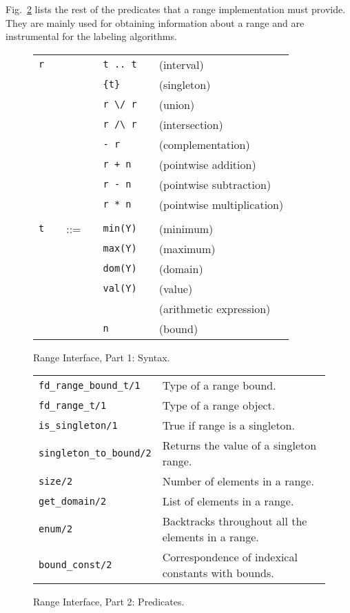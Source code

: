 \documentclass{llncs}
\begin{document}
Fig.~\ref{fig:range:preds} lists the rest of the predicates that a
range implementation must provide. They are mainly used for obtaining
information about a range and are instrumental for the labeling
algorithms.
\begin{figure}[t]
  \centering
  \begin{tabular}{lllllll}
  \verb|r|  &&  &  & \verb|t .. t| &  & (interval) \\
&&&  &  \verb|{t}| && (singleton) \\
&&&  &  \verb|r \/ r| && (union) \\
&&&  &  \verb|r /\ r| && (intersection) \\
&&&  &  \verb|- r| && (complementation) \\
&&&  &  \verb|r + n| && (pointwise addition) \\
&&&  &  \verb|r - n| && (pointwise subtraction) \\
&&&  &  \verb|r * n| && (pointwise multiplication)\\
\\
\verb|t|  && ::= && \verb|min(Y)|  && (minimum) \\
&&&  &\verb|max(Y)| && (maximum) \\
&&&  &\verb|dom(Y)|  && (domain) \\
&&&  &\verb|val(Y)| && (value) \\
&&&  &   && (arithmetic expression) \\
&&&  &\verb|n|  && (bound) \\
\end{tabular}
  \caption{Range Interface, Part 1: Syntax.}
  \label{fig:range:syntax}
\end{figure}

\begin{figure}[b]
  \centering
  \begin{tabular}{l@{\hspace{0.5cm}}l}
    \verb!fd_range_bound_t/1! &	Type of a range bound.\\
    \verb!fd_range_t/1! & Type of a range object.\\
    \verb!is_singleton/1! & True if range is a singleton.\\
    \verb!singleton_to_bound/2! & Returns the value of a singleton range.\\
    \verb!size/2! & Number of elements in a range.\\
    \verb!get_domain/2! & List of elements in a range.\\
    \verb!enum/2! & Backtracks throughout all the elements in a range.\\
    \verb!bound_const/2! & Correspondence of indexical constants with bounds.\\
  \end{tabular}
  \caption{Range Interface, Part 2: Predicates.}
  \label{fig:range:preds}
\end{figure}
\end{document}
